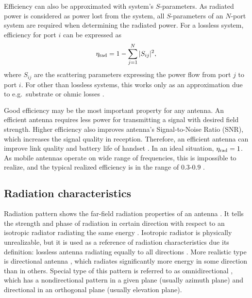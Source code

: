 Efficiency can also be approximated with system's $S$-parameters. As radiated power is considered as power lost from the system, all $S$-parameters of an $N$-port system are required when determining the radiated power. For a lossless system, efficiency for port $i$ \cite{lehtovuori_phd} can be expressed as
\begin{equation}
\label{eq:eff_aprx}
    {\eta}_{\mathrm{rad}} = 1-\sum_{j=1}^{N}|S_{ij}|^2,
\end{equation}
where $S_{ij}$ are the scattering parameters expressing the power flow from port $j$ to port $i$. For other than lossless systems, this works only as an approximation due to e.g.\ substrate or ohmic losses \cite{lehtovuori_phd}.

Good efficiency may be the most important property for any antenna. An efficient antenna requires less power for transmitting a signal with desired field strength. Higher efficiency also improves antenna's Signal-to-Noise Ratio (SNR), which increases the signal quality in reception. Therefore, an efficient antenna can improve link quality and battery life of handset \cite{molisch}. In an ideal situation, ${\eta}_{\mathrm{rad}}=1$. As mobile antennas operate on wide range of frequencies, this is impossible to realize, and the typical realized efficiency is in the range of $0.3$-$0.9$ \cite{volakis,ilvonen_phd}. %


\subsection{Radiation characteristics}
\label{sec:pattern}
Radiation pattern shows the far-field radiation properties of an antenna \cite{balanis, stutzman}. It tells the strength and phase of radiation in certain direction with respect to an isotropic radiator radiating the same energy \cite{balanis}. Isotropic radiator is physically unrealizable, but it is used as a reference of radiation characteristics due its definition: lossless antenna radiating equally to all directions \cite{balanis}. More realistic type is directional antenna \cite{balanis}, which radiates significantly more energy in some direction than in others. Special type of this pattern is referred to as omnidirectional \cite{balanis}, which has a nondirectional pattern in a given plane (usually azimuth plane) and directional in an orthogonal plane (usually elevation plane).

